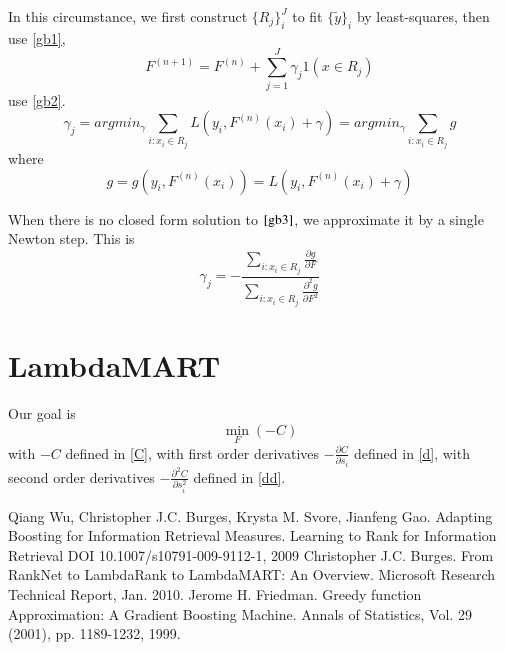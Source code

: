 \documentclass [11pt,a4paper]{article}
\begin{document}
In this circumstance, we first construct $\{R_j\}_i^J$ to fit $\{\widetilde{y}\}_i$ by least-squares,
then use \ref{gb1},
\begin{equation}
F^{(n+1)} = F^{(n)} + \sum_{j=1}^{J}\gamma_j 1(x \in R_j)
\end{equation}
use \ref{gb2}.
\begin{equation}
\label{gb3}
\gamma_j = argmin_{\gamma} \sum_{i:x_i \in R_j} L\left(y_i, F^{(n)}(x_i) + \gamma \right)
= argmin_{\gamma} \sum_{i:x_i \in R_j} g
\end{equation}
where
\begin{equation}
g = g(y_i, F^{(n)}(x_i)) = L\left(y_i, F^{(n)}(x_i) + \gamma \right)
\end{equation}


When there is no closed form solution to $\ref{gb3}$,
we approximate it by a single Newton step.
This is
\begin{equation}
\gamma_j = - \frac
{\sum_{i:x_i \in R_j} \frac{\partial g}{\partial F}}
{\sum_{i:x_i \in R_j} \frac{\partial^2 g}{\partial F^2}}
\end{equation}


\section{LambdaMART}
Our goal is
\begin{equation}
\min_{F} (-C)
\end{equation}
with $-C$ defined in \ref{C},
with first order derivatives $-\frac{\partial C}{\partial s_i}$ defined in \ref{d},
with second order derivatives $-\frac{\partial^2 C}{\partial s_i^2}$ defined in \ref{dd}.


\begin{thebibliography}{}
Qiang Wu, Christopher J.C. Burges, Krysta M. Svore, Jianfeng Gao.
Adapting Boosting for Information Retrieval Measures.
Learning to Rank for Information Retrieval DOI 10.1007/s10791-009-9112-1, 2009
Christopher J.C. Burges.
From RankNet to LambdaRank to LambdaMART: An Overview.
Microsoft Research Technical Report, Jan. 2010.
Jerome H. Friedman.
Greedy function Approximation: A Gradient Boosting Machine.
Annals of Statistics, Vol. 29 (2001), pp. 1189-1232, 1999.
\end{thebibliography}
\end{document}

